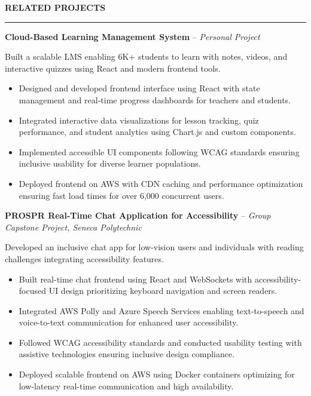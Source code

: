 \documentclass[10pt,letterpaper]{article}
\begin{document}
\vspace{6pt}

\textbf{RELATED PROJECTS}\\[-8pt]
\noindent\rule{\textwidth}{1pt}

\vspace{-2pt}

\textbf{Cloud-Based Learning Management System} -- \emph{Personal Project}

\vspace{-1pt}

Built a scalable LMS enabling 6K+ students to learn with notes, videos, and interactive quizzes using React and modern frontend tools.
\vspace{-1pt}
\begin{itemize}
\item Designed and developed frontend interface using React with state management and real-time progress dashboards for teachers and students.
\item Integrated interactive data visualizations for lesson tracking, quiz performance, and student analytics using Chart.js and custom components.
\item Implemented accessible UI components following WCAG standards ensuring inclusive usability for diverse learner populations.
\item Deployed frontend on AWS with CDN caching and performance optimization ensuring fast load times for over 6,000 concurrent users.
\end{itemize}

\textbf{PROSPR  Real-Time Chat Application for Accessibility} -- \emph{Group Capstone Project, Seneca Polytechnic}

\vspace{-1pt}

Developed an inclusive chat app for low-vision users and individuals with reading challenges integrating accessibility features.
\vspace{-1pt}
\begin{itemize}
\item Built real-time chat frontend using React and WebSockets with accessibility-focused UI design prioritizing keyboard navigation and screen readers.
\item Integrated AWS Polly and Azure Speech Services enabling text-to-speech and voice-to-text communication for enhanced user accessibility.
\item Followed WCAG accessibility standards and conducted usability testing with assistive technologies ensuring inclusive design compliance.
\item Deployed scalable frontend on AWS using Docker containers optimizing for low-latency real-time communication and high availability.
\end{itemize}
\end{document}
